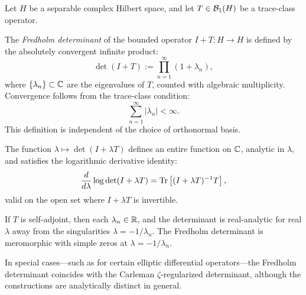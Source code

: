 \begin{definition}
\label{def:fredholm_determinant}
Let \( H \) be a separable complex Hilbert space, and let \( T \in \mathcal{B}_1(H) \) be a trace-class operator.

The \emph{Fredholm determinant} of the bounded operator \( I + T \colon H \to H \) is defined by the absolutely convergent infinite product:
\[
\det(I + T) := \prod_{n=1}^\infty (1 + \lambda_n),
\]
where \( \{ \lambda_n \} \subset \mathbb{C} \) are the eigenvalues of \( T \), counted with algebraic multiplicity. Convergence follows from the trace-class condition:
\[
\sum_{n=1}^\infty |\lambda_n| < \infty.
\]
This definition is independent of the choice of orthonormal basis.

\medskip

The function \( \lambda \mapsto \det(I + \lambda T) \) defines an entire function on \( \mathbb{C} \), analytic in \( \lambda \), and satisfies the logarithmic derivative identity:
\[
\frac{d}{d\lambda} \log \det(I + \lambda T)
= \operatorname{Tr}\left[ (I + \lambda T)^{-1} T \right],
\]
valid on the open set where \( I + \lambda T \) is invertible.

\medskip

If \( T \) is self-adjoint, then each \( \lambda_n \in \mathbb{R} \), and the determinant is real-analytic for real \( \lambda \) away from the singularities \( \lambda = -1/\lambda_n \). The Fredholm determinant is meromorphic with simple zeros at \( \lambda = -1/\lambda_n \).

\medskip

In special cases—such as for certain elliptic differential operators—the Fredholm determinant coincides with the Carleman \(\zeta\)-regularized determinant, although the constructions are analytically distinct in general.
\end{definition}

